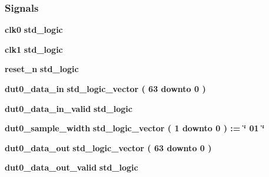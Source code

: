 \subsubsection*{Signals}
 \begin{DoxyCompactItemize}
\item 
{\bf clk0} {\bfseries \textcolor{comment}{std\+\_\+logic}\textcolor{vhdlchar}{ }} 
\item 
{\bf clk1} {\bfseries \textcolor{comment}{std\+\_\+logic}\textcolor{vhdlchar}{ }} 
\item 
{\bf reset\+\_\+n} {\bfseries \textcolor{comment}{std\+\_\+logic}\textcolor{vhdlchar}{ }} 
\item 
{\bf dut0\+\_\+data\+\_\+in} {\bfseries \textcolor{comment}{std\+\_\+logic\+\_\+vector}\textcolor{vhdlchar}{ }\textcolor{vhdlchar}{(}\textcolor{vhdlchar}{ }\textcolor{vhdlchar}{ } \textcolor{vhdldigit}{63} \textcolor{vhdlchar}{ }\textcolor{keywordflow}{downto}\textcolor{vhdlchar}{ }\textcolor{vhdlchar}{ } \textcolor{vhdldigit}{0} \textcolor{vhdlchar}{ }\textcolor{vhdlchar}{)}\textcolor{vhdlchar}{ }} 
\item 
{\bf dut0\+\_\+data\+\_\+in\+\_\+valid} {\bfseries \textcolor{comment}{std\+\_\+logic}\textcolor{vhdlchar}{ }} 
\item 
{\bf dut0\+\_\+sample\+\_\+width} {\bfseries \textcolor{comment}{std\+\_\+logic\+\_\+vector}\textcolor{vhdlchar}{ }\textcolor{vhdlchar}{(}\textcolor{vhdlchar}{ }\textcolor{vhdlchar}{ } \textcolor{vhdldigit}{1} \textcolor{vhdlchar}{ }\textcolor{keywordflow}{downto}\textcolor{vhdlchar}{ }\textcolor{vhdlchar}{ } \textcolor{vhdldigit}{0} \textcolor{vhdlchar}{ }\textcolor{vhdlchar}{)}\textcolor{vhdlchar}{ }\textcolor{vhdlchar}{ }\textcolor{vhdlchar}{ }\textcolor{vhdlchar}{\+:}\textcolor{vhdlchar}{=}\textcolor{vhdlchar}{ }\textcolor{vhdlchar}{ }\textcolor{vhdlchar}{ }\textcolor{vhdlchar}{ }\textcolor{keyword}{\char`\"{} 01 \char`\"{}}\textcolor{vhdlchar}{ }} 
\item 
{\bf dut0\+\_\+data\+\_\+out} {\bfseries \textcolor{comment}{std\+\_\+logic\+\_\+vector}\textcolor{vhdlchar}{ }\textcolor{vhdlchar}{(}\textcolor{vhdlchar}{ }\textcolor{vhdlchar}{ } \textcolor{vhdldigit}{63} \textcolor{vhdlchar}{ }\textcolor{keywordflow}{downto}\textcolor{vhdlchar}{ }\textcolor{vhdlchar}{ } \textcolor{vhdldigit}{0} \textcolor{vhdlchar}{ }\textcolor{vhdlchar}{)}\textcolor{vhdlchar}{ }} 
\item 
{\bf dut0\+\_\+data\+\_\+out\+\_\+valid} {\bfseries \textcolor{comment}{std\+\_\+logic}\textcolor{vhdlchar}{ }} 
\item 

\end{DoxyCompactItemize}
